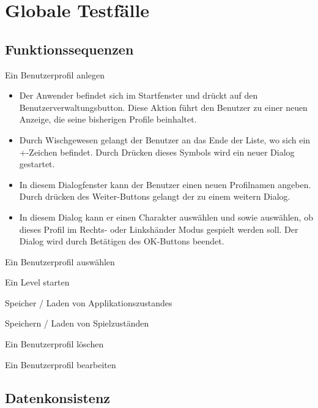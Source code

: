 \documentclass{scrartcl}
\begin{document}
\clearpage


\section{Globale Testfälle}

\subsection{Funktionssequenzen}

\begin{telist}
	\item Ein Benutzerprofil anlegen
	\begin{itemize}
		\item Der Anwender befindet sich im Startfenster und drückt auf den \glqq Benutzerverwaltungsbutton\grqq. Diese Aktion führt den Benutzer zu einer neuen Anzeige, die seine bisherigen Profile beinhaltet.
		\item Durch Wischgewesen gelangt der Benutzer an das Ende der Liste, wo sich ein \glqq +\grqq-Zeichen befindet. Durch Drücken dieses Symbols wird ein neuer Dialog gestartet.
		\item In diesem Dialogfenster kann der Benutzer einen neuen Profilnamen angeben. Durch drücken des \glqq Weiter\grqq-Buttons gelangt der zu einem weitern Dialog.
		\item In diesem Dialog kann er einen Charakter auswählen und sowie auswählen, ob dieses Profil im Rechts- oder Linkshänder Modus gespielt werden soll. Der Dialog wird durch Betätigen des \glqq OK\grqq-Buttons beendet.
	\end{itemize}
	\item Ein Benutzerprofil auswählen
	\item Ein Level starten
	\item Speicher / Laden von Applikationszustandes
	\item Speichern / Laden von Spielzuständen
	\item Ein Benutzerprofil löschen
	\item Ein Benutzerprofil bearbeiten
	\item 
\end{telist}

\subsection{Datenkonsistenz}

\begin{telist}[resume]
	\item 
\end{telist}
\end{document}
